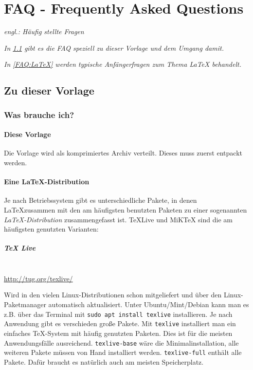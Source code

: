 \chapter{FAQ - Frequently Asked Questions}
	\emph{engl.: Häufig stellte Fragen}
	
	\emph{In \ref{FAQ:Vorlage} gibt es die FAQ speziell zu dieser Vorlage und dem Umgang damit.}
	
	\emph{In \ref{FAQ:LaTeX} werden typische Anfängerfragen zum Thema \LaTeX{} behandelt.} 
	
	\section{Zu dieser Vorlage}\label{FAQ:Vorlage}
		\subsection{Was brauche ich?}
			\subsubsection{Diese Vorlage}
			Die Vorlage wird als komprimiertes Archiv verteilt. Dieses muss zuerst entpackt werden.
			
			\subsubsection{Eine LaTeX-Distribution}
			Je nach Betriebssystem gibt es unterschiedliche Pakete, in denen \LaTeX zusammen mit den am häufigsten benutzten Paketen zu einer sogenannten \emph{\LaTeX-Distribution} zusammengefasst ist.
%			
			\TeX Live und MiKTeX sind die am häufigsten genutzten Varianten:
			
			\paragraph{TeX Live}~\\
			     
			\hfill
			\url{http://tug.org/texlive/}
			\medskip
			
			\noindent Wird in den vielen Linux-Distributionen schon mitgeliefert und über den Linux-Paketmanager automatisch aktualisiert.
			Unter Ubuntu/Mint/Debian kann man es z.B. über das Terminal mit  
			\lstinline|sudo apt install texlive| installieren.
			Je nach Anwendung gibt es verschieden große Pakete. Mit \lstinline|texlive| installiert man ein einfaches TeX-System mit häufig genutzten Paketen. Dies ist für die meisten Anwendungsfälle ausreichend.
			\lstinline|texlive-base| wäre die Minimalinstallation, alle weiteren Pakete müssen von Hand installiert werden.
			\lstinline|texlive-full| enthält alle Pakete. Dafür braucht es natürlich auch am meisten Speicherplatz.
			
